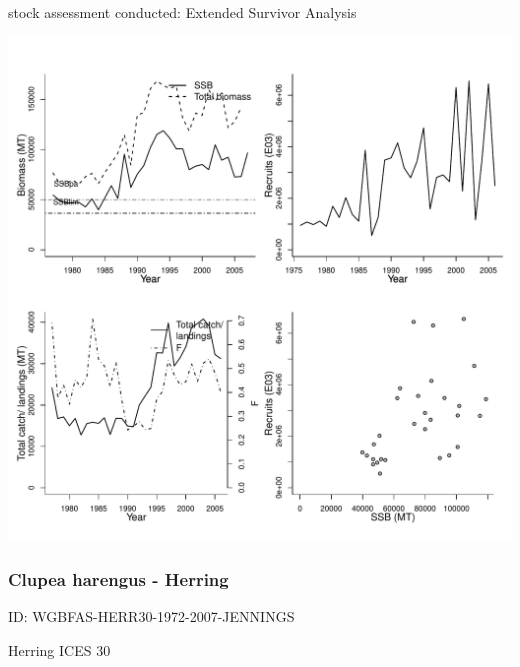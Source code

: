 stock assessment conducted: Extended Survivor Analysis 
\begin{center}
\vspace{-0.2cm}\includegraphics[scale=0.65]{../tex/figures/plot-WGBFAS-HERRRIGA-1976-2007-JENNINGS.pdf}
\end{center}

\newpage
\subsubsection{Clupea harengus - Herring}
ID: WGBFAS-HERR30-1972-2007-JENNINGS

Herring ICES 30 

